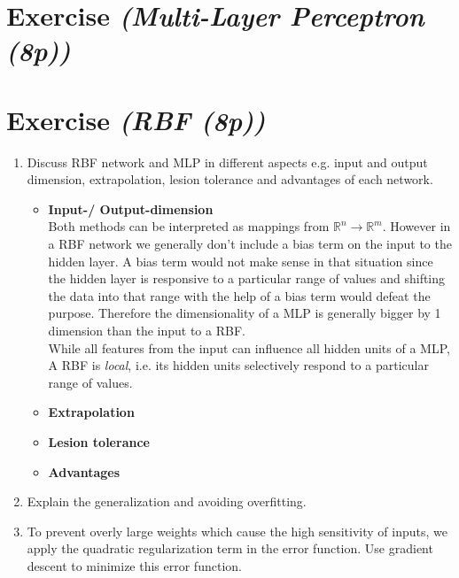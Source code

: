 \documentclass{article}
\author{Sandra Kohl, Jan Hendrik Kirchner, Max Bernhard Ilsen}
\begin{document}
\section{Exercise \textit{(Multi-Layer Perceptron (8p))}}
\section{Exercise \textit{(RBF (8p))}}
\begin{enumerate}
    \item Discuss RBF network and MLP in different aspects e.g. input and output dimension, extrapolation, lesion tolerance and advantages of each network.
	\begin{itemize}
		\item \textbf{Input-/ Output-dimension} \\
			Both methods can be interpreted as mappings from $\mathbb{R}^n \to \mathbb{R}^m$. However in a RBF network we generally don't include a bias term on the input to the hidden layer. A bias term would not make sense in that situation since the hidden layer is responsive to a particular range of values and shifting the data into that range with the help of a bias term would defeat the purpose. Therefore the dimensionality of a MLP is generally bigger by 1 dimension than the input to a RBF. \\
			While all features from the input can influence all hidden units of a MLP, A RBF is \textit{local}, i.e. its hidden units selectively respond to a particular range of values.
		\item \textbf{Extrapolation} \\
		\item \textbf{Lesion tolerance} \\
		\item \textbf{Advantages} \\

	\end{itemize}
    \item Explain the generalization and avoiding overfitting.
        
    \item To prevent overly large weights which cause the high sensitivity of inputs, we apply the
        quadratic regularization term in the error function. Use gradient descent to minimize this
        error function.
        
\end{enumerate}
\end{document}
